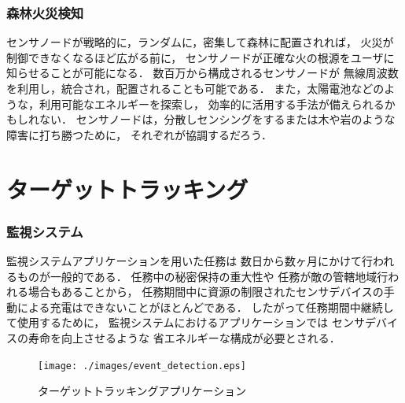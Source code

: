 \subsubsection{森林火災検知}

\vspace{0.5em}センサノードが戦略的に，ランダムに，密集して森林に配置されれば，
火災が制御できなくなるほど広がる前に，
センサノードが正確な火の根源をユーザに知らせることが可能になる．
数百万から構成されるセンサノードが
無線周波数を利用し，統合され，配置されることも可能である．
また，太陽電池などのような，利用可能なエネルギーを探索し，
効率的に活用する手法が備えられるかもしれない．
センサノードは，分散しセンシングをするまたは木や岩のような障害に打ち勝つために，
それぞれが協調するだろう．




\section{ターゲットトラッキング}

\subsubsection{監視システム}

\vspace{0.5em}監視システムアプリケーションを用いた任務は
数日から数ヶ月にかけて行われるものが一般的である．
任務中の秘密保持の重大性や
任務が敵の管轄地域行われる場合もあることから，
任務期間中に資源の制限されたセンサデバイスの手動による充電はできないことがほとんどである．
したがって任務期間中継続して使用するために，
監視システムにおけるアプリケーションでは
センサデバイスの寿命を向上させるような
省エネルギーな構成が必要とされる．


\begin{figure}[htbp]
 \begin{center}
  \texttt{[image: ./images/event\_detection.eps]}
 \end{center}
 \caption{ターゲットトラッキングアプリケーション}
 \label{fig:event_detection}
\end{figure}


